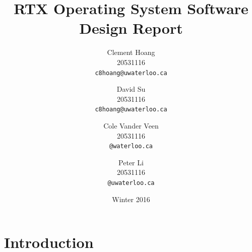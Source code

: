 \documentclass[12pt]{report}
\begin{document}
\title{RTX Operating System Software Design Report}

\author{
    Clement Hoang\\
		20531116\\
    \texttt{c8hoang@uwaterloo.ca}
    \and
    David Su\\
		20531116\\
    \texttt{c8hoang@uwaterloo.ca}
    \and
    Cole Vander Veen\\
		20531116\\
    \texttt{@waterloo.ca}
    \and
    Peter Li\\
		20531116\\
    \texttt{@uwaterloo.ca}
}

\date{Winter 2016}

\maketitle


\tableofcontents
\listofalgorithms
\listoffigures

\chapter{Introduction}

%
%
\end{document}
